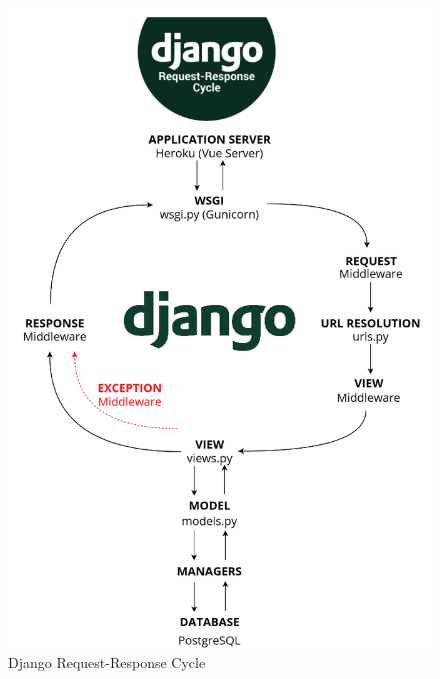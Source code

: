\documentclass[table, 12pt]{article}
\begin{document}
\begin{center}
    \begin{figure}[H]
        \includegraphics[scale=0.55, center]{assets/django_request_response_flow.png}
        \caption{Django Request-Response Cycle}
        \label{fig: django_flow}
    \end{figure}
\end{center}
\end{document}
